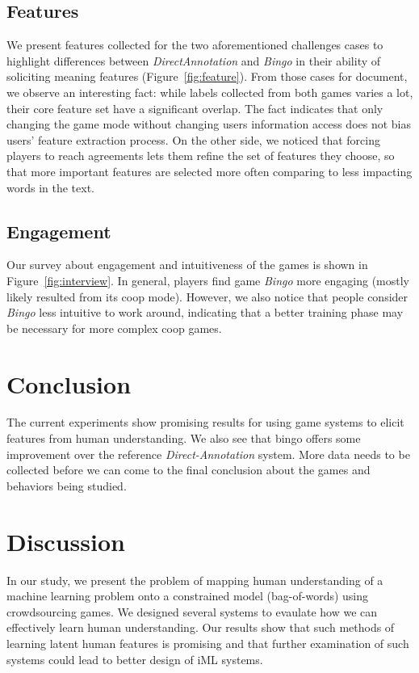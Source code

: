 \documentclass[chi_draft]{sigchi}
\begin{document}
\subsection{Features}

We present features collected for the two aforementioned challenges cases to highlight differences between \emph{DirectAnnotation} and \emph{Bingo} in their ability of soliciting meaning features (Figure~\ref{fig:feature}). From those cases for document, we observe an interesting fact: while labels collected from both games varies a lot, their core feature set have a significant overlap. The fact indicates that only changing the game mode without changing users information access does not bias users' feature extraction process. On the other side, we noticed that forcing players to reach agreements lets them refine the set of features they choose, so that more important features are selected more often comparing to less impacting words in the text.

\subsection{Engagement}
 Our survey about engagement and intuitiveness of the games is shown in Figure~\ref{fig:interview}. In general, players find game \emph{Bingo} more engaging (mostly likely resulted from its coop mode). However, we also notice that people consider \emph{Bingo} less intuitive to work around, indicating that a better training phase may be necessary for more complex coop games.

\section{Conclusion}
The current experiments show promising results for using game systems to elicit features from human understanding. We also see that bingo offers some improvement over the reference \emph{Direct-Annotation} system. More data needs to be collected before we can come to the final conclusion about the games and behaviors being studied.


\section{Discussion}
In our study, we present the problem of mapping human understanding of a machine learning problem onto a constrained model (bag-of-words) using crowdsourcing games. We designed several systems to evaulate how we can effectively learn human understanding. Our results show that such methods of learning latent human features is promising and that further examination of such systems could lead to better design of iML systems.
\end{document}
